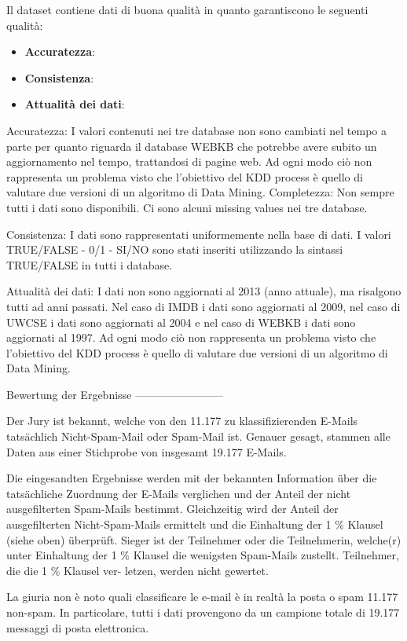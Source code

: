Il dataset contiene dati di buona qualità in quanto garantiscono le seguenti qualità:

\begin{itemize}
	\item \textbf{Accuratezza}:
	\item \textbf{Consistenza}:
	\item \textbf{Attualità dei dati}:
\end{itemize}

Accuratezza: I valori contenuti nei tre database non sono cambiati nel tempo a parte per quanto riguarda il database WEBKB che potrebbe avere subito un aggiornamento nel tempo, trattandosi di pagine web. Ad ogni modo ciò non rappresenta un problema visto che l’obiettivo del KDD process è quello di valutare due versioni di un algoritmo di Data Mining.
Completezza: Non sempre tutti i dati sono disponibili. Ci sono alcuni missing values nei tre database.

Consistenza: I dati sono rappresentati uniformemente nella base di dati. I valori TRUE/FALSE - 0/1 - SI/NO sono stati inseriti utilizzando la sintassi TRUE/FALSE in tutti i database.

Attualità dei dati: I dati non sono aggiornati al 2013 (anno attuale), ma risalgono tutti ad anni passati. Nel caso di IMDB i dati sono aggiornati al 2009, nel caso di UWCSE i dati sono aggiornati al 2004 e nel caso di WEBKB
i dati sono aggiornati al 1997. Ad ogni modo ciò non rappresenta un problema visto che l’obiettivo del KDD process è quello di valutare due versioni di un algoritmo di Data Mining.

Bewertung der Ergebnisse
------------------------

Der Jury ist bekannt, welche von den 11.177 zu klassifizierenden
E-Mails tatsächlich Nicht-Spam-Mail oder Spam-Mail ist. Genauer
gesagt, stammen alle Daten aus einer Stichprobe von insgesamt
19.177 E-Mails.

Die eingesandten Ergebnisse werden mit der bekannten Information über
die tatsächliche Zuordnung der E-Mails verglichen und der Anteil der
nicht ausgefilterten Spam-Mails bestimmt. Gleichzeitig wird der Anteil
der ausgefilterten Nicht-Spam-Mails ermittelt und die Einhaltung
der 1 \% Klausel (siehe oben) überprüft. Sieger ist der Teilnehmer
oder die Teilnehmerin, welche(r) unter Einhaltung der 1 \% Klausel die
wenigsten Spam-Mails zustellt. Teilnehmer, die die 1 \% Klausel ver-
letzen, werden nicht gewertet.

La giuria non è noto quali classificare le e-mail è in realtà la posta o spam 11.177 non-spam. In particolare, tutti i dati provengono da un campione totale di 19.177 messaggi di posta elettronica.


